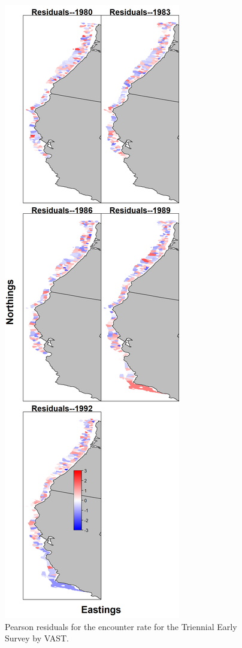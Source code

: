 \documentclass[12pt,]{article}
\begin{document}
\begin{figure}
\centering
\includegraphics{Figures/tri_early_maps--encounter_pearson_resid.png}
\caption{Pearson residuals for the encounter rate for the Triennial
Early Survey by VAST. \label{fig:tri_early_enc_rate}}
\end{figure}
\end{document}
